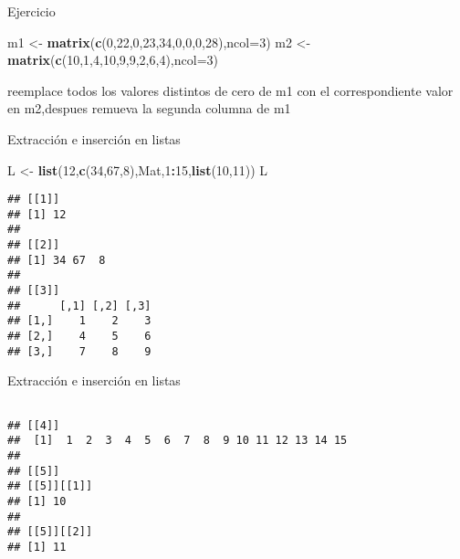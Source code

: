 \documentclass[ignorenonframetext,]{beamer}
\newenvironment{Shaded}{\begin{snugshade}}{\end{snugshade}}
\newcommand{\KeywordTok}[1]{\textcolor[rgb]{0.13,0.29,0.53}{\textbf{#1}}}
\newcommand{\DataTypeTok}[1]{\textcolor[rgb]{0.13,0.29,0.53}{#1}}
\newcommand{\DecValTok}[1]{\textcolor[rgb]{0.00,0.00,0.81}{#1}}
\newcommand{\StringTok}[1]{\textcolor[rgb]{0.31,0.60,0.02}{#1}}
\newcommand{\OperatorTok}[1]{\textcolor[rgb]{0.81,0.36,0.00}{\textbf{#1}}}
\newcommand{\NormalTok}[1]{#1}
\begin{document}
\begin{frame}[fragile]{Ejercicio}

\begin{Shaded}
\begin{Highlighting}[]
\NormalTok{m1 <-}\StringTok{ }\KeywordTok{matrix}\NormalTok{(}\KeywordTok{c}\NormalTok{(}\DecValTok{0}\NormalTok{,}\DecValTok{22}\NormalTok{,}\DecValTok{0}\NormalTok{,}\DecValTok{23}\NormalTok{,}\DecValTok{34}\NormalTok{,}\DecValTok{0}\NormalTok{,}\DecValTok{0}\NormalTok{,}\DecValTok{0}\NormalTok{,}\DecValTok{28}\NormalTok{),}\DataTypeTok{ncol=}\DecValTok{3}\NormalTok{)}
\NormalTok{m2 <-}\StringTok{ }\KeywordTok{matrix}\NormalTok{(}\KeywordTok{c}\NormalTok{(}\DecValTok{10}\NormalTok{,}\DecValTok{1}\NormalTok{,}\DecValTok{4}\NormalTok{,}\DecValTok{10}\NormalTok{,}\DecValTok{9}\NormalTok{,}\DecValTok{9}\NormalTok{,}\DecValTok{2}\NormalTok{,}\DecValTok{6}\NormalTok{,}\DecValTok{4}\NormalTok{),}\DataTypeTok{ncol=}\DecValTok{3}\NormalTok{)}
\end{Highlighting}
\end{Shaded}

reemplace todos los valores distintos de cero de m1 con el
correspondiente valor en m2,despues remueva la segunda columna de m1

\end{frame}

\begin{frame}[fragile]{Extracción e inserción en listas}

\begin{Shaded}
\begin{Highlighting}[]
\NormalTok{L <-}\StringTok{ }\KeywordTok{list}\NormalTok{(}\DecValTok{12}\NormalTok{,}\KeywordTok{c}\NormalTok{(}\DecValTok{34}\NormalTok{,}\DecValTok{67}\NormalTok{,}\DecValTok{8}\NormalTok{),Mat,}\DecValTok{1}\OperatorTok{:}\DecValTok{15}\NormalTok{,}\KeywordTok{list}\NormalTok{(}\DecValTok{10}\NormalTok{,}\DecValTok{11}\NormalTok{))}
\NormalTok{L}
\end{Highlighting}
\end{Shaded}
\pause
\begin{verbatim}
## [[1]]
## [1] 12
## 
## [[2]]
## [1] 34 67  8
## 
## [[3]]
##      [,1] [,2] [,3]
## [1,]    1    2    3
## [2,]    4    5    6
## [3,]    7    8    9

\end{verbatim}

\end{frame}

\begin{frame}[fragile]{Extracción e inserción en listas}
\pause
\begin{verbatim}

## [[4]]
##  [1]  1  2  3  4  5  6  7  8  9 10 11 12 13 14 15
## 
## [[5]]
## [[5]][[1]]
## [1] 10
## 
## [[5]][[2]]
## [1] 11
\end{verbatim}

\end{frame}
\end{document}

